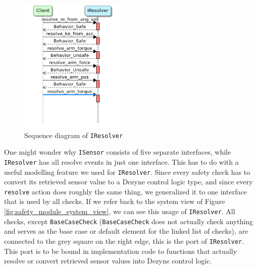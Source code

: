 \documentclass[12pt]{scrreprt}
\begin{document}
\begin{appendices}
\begin{figure}[H]
    \centering
    \includegraphics[width=0.45\textwidth]{Figures/results/modelling_figures/IResolver/IResolver_seq.png}
    \caption{Sequence diagram of \texttt{IResolver}}
    \label{fig:IResolver_seq}
\end{figure}

One might wonder why \texttt{ISensor} consists of five separate interfaces, while \texttt{IResolver} has all resolve events in just one interface. This has to do with a useful modelling feature we used for \texttt{IResolver}. Since every safety check has to convert its retrieved sensor value to a Dezyne control logic type, and since every \texttt{resolve} action does roughly the same thing, we generalized it to one interface that is used by all checks. If we refer back to the system view of Figure \ref{fig:safety_module_system_view}, we can see this usage of \texttt{IResolver}. All checks, except \texttt{BaseCaseCheck} (\texttt{BaseCaseCheck} does not actually check anything and serves as the base case or default element for the linked list of checks), are connected to the grey square on the right edge, this is the port of \texttt{IResolver}. This port is to be bound in implementation code to functions that actually resolve or convert retrieved sensor values into Dezyne control logic.


\end{appendices}
\end{document}
